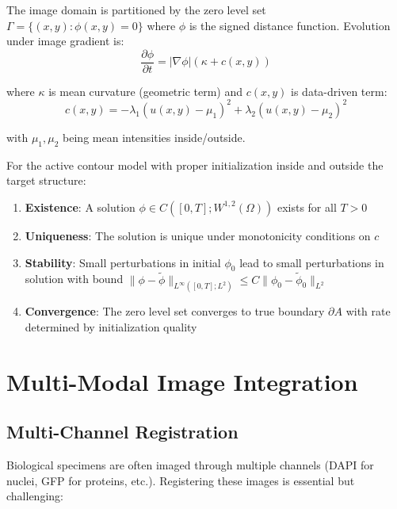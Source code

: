 \documentclass[twocolumn,11pt]{article}
\begin{document}
\begin{definition}
The image domain is partitioned by the zero level set $\Gamma = \{(x,y) : \phi(x,y) = 0\}$ where $\phi$ is the signed distance function. Evolution under image gradient is:
\begin{equation}
\frac{\partial \phi}{\partial t} = |\nabla \phi| \left( \kappa + c(x,y) \right)
\end{equation}

where $\kappa$ is mean curvature (geometric term) and $c(x,y)$ is data-driven term:
\begin{equation}
c(x,y) = -\lambda_1 (u(x,y) - \mu_1)^2 + \lambda_2 (u(x,y) - \mu_2)^2
\end{equation}

with $\mu_1, \mu_2$ being mean intensities inside/outside.
\end{definition}

\begin{theorem}
For the active contour model with proper initialization inside and outside the target structure:
\begin{enumerate}
\item \textbf{Existence}: A solution $\phi \in C([0,T]; W^{1,2}(\Omega))$ exists for all $T > 0$
\item \textbf{Uniqueness}: The solution is unique under monotonicity conditions on $c$
\item \textbf{Stability}: Small perturbations in initial $\phi_0$ lead to small perturbations in solution with bound $\|\phi - \tilde{\phi}\|_{L^\infty([0,T]; L^2)} \leq C \|\phi_0 - \tilde{\phi}_0\|_{L^2}$
\item \textbf{Convergence}: The zero level set converges to true boundary $\partial A$ with rate determined by initialization quality
\end{enumerate}
\end{theorem}

\section{Multi-Modal Image Integration}

\subsection{Multi-Channel Registration}

Biological specimens are often imaged through multiple channels (DAPI for nuclei, GFP for proteins, etc.). Registering these images is essential but challenging:
\end{document}
